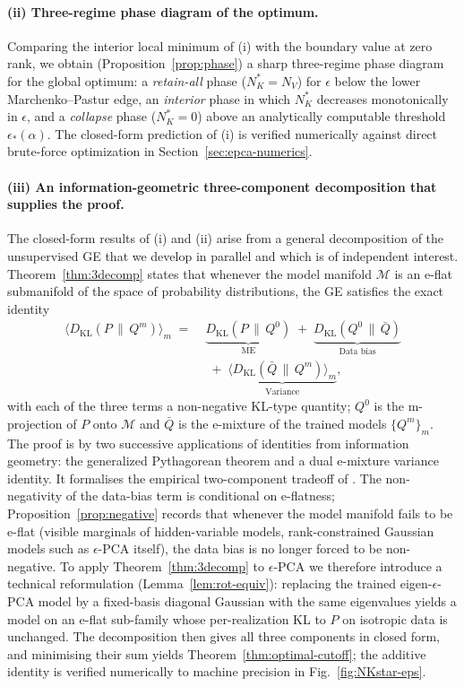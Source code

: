 \documentclass[11pt,a4paper]{article}
\theoremstyle{definition}
\theoremstyle{remark}
\newcommand{\KL}{D_{\mathrm{KL}}}
\newcommand{\PV}{P}
\newcommand{\QVz}{Q^{0}}
\newcommand{\QVm}{Q^{m}}
\newcommand{\QVbar}{\bar{Q}}
\newcommand{\NK}{N_K}
\newcommand{\NV}{N_V}
\newcommand{\Mfam}{\mathcal{M}}
\begin{document}
\paragraph{(ii) Three-regime phase diagram of the optimum.}
Comparing the interior local minimum of (i) with the boundary value
at zero rank, we obtain (Proposition~\ref{prop:phase}) a sharp
three-regime phase diagram for the global optimum: a
\emph{retain-all} phase ($\NK^{*} = \NV$) for $\epsilon$ below the
lower Marchenko--Pastur edge, an \emph{interior} phase in which
$\NK^{*}$ decreases monotonically in $\epsilon$, and a
\emph{collapse} phase ($\NK^{*} = 0$) above an analytically
computable threshold $\epsilon_{*}(\alpha)$. The closed-form
prediction of (i) is verified numerically against direct
brute-force optimization in
Section~\ref{sec:epca-numerics}.

\paragraph{(iii) An information-geometric three-component
decomposition that supplies the proof.}
The closed-form results of (i) and (ii) arise from a general
decomposition of the unsupervised GE that we develop in parallel
and which is of independent interest. Theorem~\ref{thm:3decomp}
states that whenever the model manifold $\Mfam$ is an e-flat
submanifold of the space of probability distributions, the GE
satisfies the exact identity
\begin{align}
  \big\langle \KL(\PV \,\|\, \QVm) \big\rangle_{m}
  \;=\;
  & \underbrace{\KL(\PV \,\|\, \QVz)}_{\text{ME}}
    \;+\;
    \underbrace{\KL(\QVz \,\|\, \QVbar)}_{\text{Data bias}}
  \nonumber \\
  & \;+\;
    \underbrace{\big\langle \KL(\QVbar \,\|\, \QVm) \big\rangle_{m}}_{\text{Variance}},
  \label{eq:3decomp}
\end{align}
with each of the three terms a non-negative KL-type quantity;
$\QVz$ is the m-projection of $\PV$ onto $\Mfam$ and $\QVbar$
is the e-mixture of the trained models $\{\QVm\}_m$. The proof
is by two successive applications of identities from
information geometry: the generalized Pythagorean theorem
\cite[Thm.~3.8]{Amari2016} and a dual e-mixture variance
identity. It formalises the empirical two-component tradeoff of
\cite{Kim2023JSTAT}. The non-negativity of the data-bias term is
conditional on e-flatness; Proposition~\ref{prop:negative}
records that whenever the model manifold fails to be e-flat
(visible marginals of hidden-variable models, rank-constrained
Gaussian models such as $\epsilon$-PCA itself), the data bias
is no longer forced to be non-negative. To apply
Theorem~\ref{thm:3decomp} to $\epsilon$-PCA we therefore
introduce a technical reformulation
(Lemma~\ref{lem:rot-equiv}): replacing the trained
eigen-$\epsilon$-PCA model by a fixed-basis diagonal Gaussian
with the same eigenvalues yields a model on an e-flat
sub-family whose per-realization KL to $\PV$ on isotropic data
is unchanged. The decomposition then gives all three components
in closed form, and minimising their sum yields
Theorem~\ref{thm:optimal-cutoff}; the additive identity is
verified numerically to machine precision in
Fig.~\ref{fig:NKstar-eps}.
\end{document}
